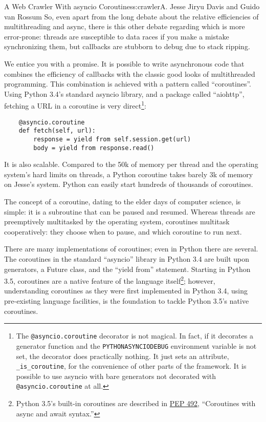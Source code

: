 \begin{aosachapter}{A Web Crawler With asyncio Coroutines}{s:crawler}{A. Jesse Jiryu Davis and Guido van Rossum}
So, even apart from the long debate about the relative efficiencies of
multithreading and async, there is this other debate regarding which is
more error-prone: threads are susceptible to data races if you make a
mistake synchronizing them, but callbacks are stubborn to debug due to
stack ripping.

\label{coroutines}

We entice you with a promise. It is possible to write asynchronous code
that combines the efficiency of callbacks with the classic good looks of
multithreaded programming. This combination is achieved with a pattern
called ``coroutines''. Using Python 3.4's standard asyncio library, and
a package called ``aiohttp'', fetching a URL in a coroutine is very
direct\footnote{The \texttt{@asyncio.coroutine} decorator is not
  magical. In fact, if it decorates a generator function and the
  \texttt{PYTHONASYNCIODEBUG} environment variable is not set, the
  decorator does practically nothing. It just sets an attribute,
  \texttt{\_is\_coroutine}, for the convenience of other parts of the
  framework. It is possible to use asyncio with bare generators not
  decorated with \texttt{@asyncio.coroutine} at all.}:

\begin{verbatim}
    @asyncio.coroutine
    def fetch(self, url):
        response = yield from self.session.get(url)
        body = yield from response.read()
\end{verbatim}

It is also scalable. Compared to the 50k of memory per thread and the
operating system's hard limits on threads, a Python coroutine takes
barely 3k of memory on Jesse's system. Python can easily start hundreds
of thousands of coroutines.

The concept of a coroutine, dating to the elder days of computer
science, is simple: it is a subroutine that can be paused and resumed.
Whereas threads are preemptively multitasked by the operating system,
coroutines multitask cooperatively: they choose when to pause, and which
coroutine to run next.

There are many implementations of coroutines; even in Python there are
several. The coroutines in the standard ``asyncio'' library in Python
3.4 are built upon generators, a Future class, and the ``yield from''
statement. Starting in Python 3.5, coroutines are a native feature of
the language itself\footnote{Python 3.5's built-in coroutines are
  described in \href{https://www.python.org/dev/peps/pep-0492/}{PEP
  492}, ``Coroutines with async and await syntax.''}; however,
understanding coroutines as they were first implemented in Python 3.4,
using pre-existing language facilities, is the foundation to tackle
Python 3.5's native coroutines.


\end{aosachapter}
